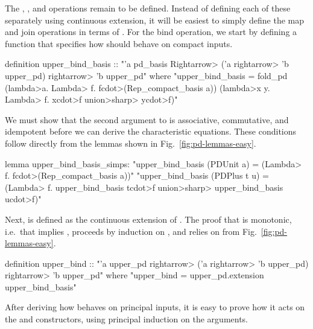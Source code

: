 The , , and  operations remain to be defined. Instead of defining each of these separately using continuous extension, it will be easiest to simply define the map and join operations in terms of . For the bind operation, we start by defining a function  that specifies how  should behave on compact inputs.
%
\begin{isacode}
definition upper_bind_basis ::
    "'a pd_basis \<Rightarrow> ('a \<rightarrow> 'b upper_pd) \<rightarrow> 'b upper_pd"
  where "upper_bind_basis =
    fold_pd (\<lambda>a. \<Lambda> f. f\<cdot>(Rep_compact_basis a)) (\<lambda>x y. \<Lambda> f. x\<cdot>f \<union>\<sharp> y\<cdot>f)"
\end{isacode}
%
We must show that the second argument to  is associative, commutative, and idempotent before we can derive the characteristic equations. These conditions follow directly from the lemmas shown in Fig.~\ref{fig:pd-lemmas-easy}.
%
\begin{isacode}
lemma upper_bind_basis_simps:
  "upper_bind_basis (PDUnit a) = (\<Lambda> f. f\<cdot>(Rep_compact_basis a))"
  "upper_bind_basis (PDPlus t u) =
    (\<Lambda> f. upper_bind_basis t\<cdot>f \<union>\<sharp> upper_bind_basis u\<cdot>f)"
\end{isacode}
%
Next,  is defined as the continuous extension of . The proof that  is monotonic, i.e.\ that  implies  , proceeds by induction on , and relies on  from Fig.~\ref{fig:pd-lemmas-easy}.
%
\begin{isacode}
definition upper_bind :: "'a upper_pd \<rightarrow> ('a \<rightarrow> 'b upper_pd) \<rightarrow> 'b upper_pd"
  where "upper_bind = upper_pd.extension upper_bind_basis"
\end{isacode}
%
After deriving how  behaves on principal inputs, it is easy to prove how it acts on the  and  constructors, using principal induction on the arguments.
%
